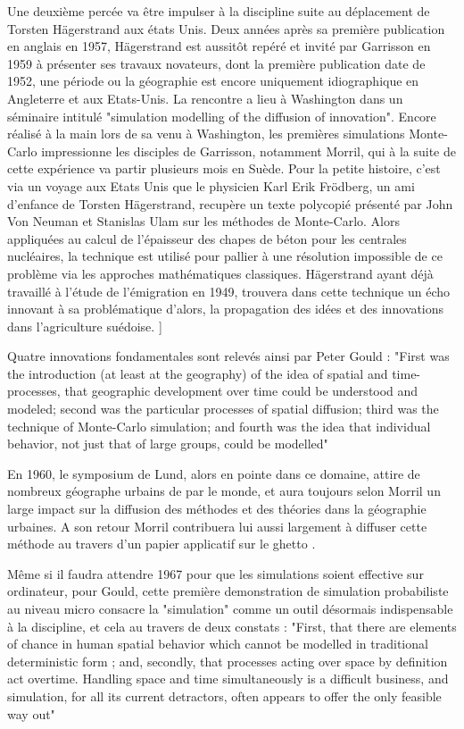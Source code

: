 Une deuxième percée va être impulser à la discipline suite au déplacement de Torsten Hägerstrand aux états Unis.  Deux années après sa première publication en anglais en 1957, Hägerstrand est aussitôt repéré et invité par Garrisson en 1959 à présenter ses travaux novateurs, dont la première publication date de 1952, une période ou la géographie est encore uniquement idiographique en Angleterre et aux Etats-Unis. La rencontre a lieu à Washington dans un séminaire intitulé "simulation modelling of the diffusion of innovation". Encore réalisé à la main lors de sa venu à Washington, les premières simulations Monte-Carlo impressionne les disciples de Garrisson, notamment Morril, qui à la suite de cette expérience va partir plusieurs mois en Suède\autocite{Morril2005}. Pour la petite histoire, c'est via un voyage aux Etats Unis que le physicien Karl Erik Frödberg, un ami d'enfance de Torsten Hägerstrand, recupère un texte polycopié présenté par John Von Neuman et Stanislas Ulam sur les méthodes de Monte-Carlo. Alors appliquées au calcul de l'épaisseur des chapes de béton pour les centrales nucléaires, la technique est utilisé pour pallier à une résolution impossible de ce problème via les approches mathématiques classiques. Hägerstrand ayant déjà travaillé à l'étude de l'émigration en 1949, trouvera dans cette technique un écho innovant à sa problématique d'alors, la propagation des idées et des innovations dans l'agriculture suédoise. \autocite[26-28]{Gould2004}]

Quatre innovations fondamentales sont relevés ainsi par Peter Gould : "First was the introduction (at least at the geography) of the idea of spatial and time-processes, that geographic development over time could be understood and modeled; second was the particular processes of spatial diffusion; third was the technique of Monte-Carlo simulation; and fourth was the idea that individual behavior, not just that of large groups, could be modelled"

En 1960, le symposium de Lund, alors en pointe dans ce domaine, attire de nombreux géographe urbains de par le monde, et aura toujours selon Morril un large impact sur la diffusion des méthodes et des théories dans la géographie urbaines. A son retour Morril contribuera lui aussi largement à diffuser cette méthode au travers d'un papier applicatif sur le ghetto \autocite{Morril1965}. 

Même si il faudra attendre 1967 \autocite{Hagerstrand1967} pour que les simulations soient effective sur ordinateur, pour Gould, cette première demonstration de simulation probabiliste au niveau micro consacre la "simulation" comme un outil désormais indispensable à la discipline, et cela au travers de deux constats : "First, that there are elements of chance in human spatial behavior which cannot be modelled in traditional deterministic form ; and, secondly, that processes acting over space by definition act overtime. Handling space and time simultaneously is a difficult business, and simulation, for all its current detractors, often appears to offer the only feasible way out" \autocite{Gould1970}

